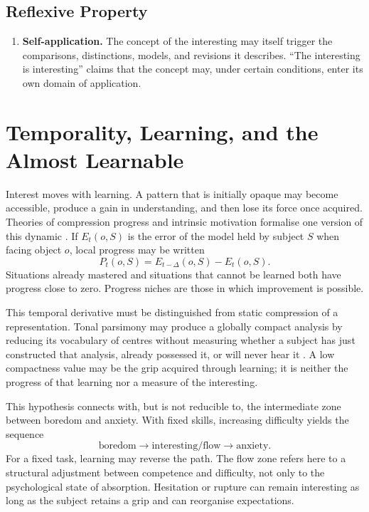 \documentclass[11pt,a4paper]{article}
\begin{document}
\subsection{Reflexive Property}

\begin{enumerate}[resume]
  \item \textbf{Self-application.} The concept of the interesting may itself
        trigger the comparisons, distinctions, models, and revisions it
        describes. ``The interesting is interesting'' claims that the concept
        may, under certain conditions, enter its own domain of application.
\end{enumerate}

\section{Temporality, Learning, and the Almost Learnable}

Interest moves with learning. A pattern that is initially opaque may become
accessible, produce a gain in understanding, and then lose its force once
acquired. Theories of compression progress and intrinsic motivation formalise
one version of this dynamic
\parencite{schmidhuber1997interesting,schmidhuber2009compression,oudeyer2007intrinsic,oudeyer2007typology}.
If \(E_t(o,S)\) is the error of the model held by subject \(S\) when facing
object \(o\), local progress may be written
\[
  P_t(o,S)=E_{t-\Delta}(o,S)-E_t(o,S).
\]
Situations already mastered and situations that cannot be learned both have
progress close to zero. Progress niches are those in which improvement is
possible.

This temporal derivative must be distinguished from static compression of a
representation. Tonal parsimony may produce a globally compact analysis by
reducing its vocabulary of centres without measuring whether a subject has just
constructed that analysis, already possessed it, or will never hear it
\parencite{pachet2026tonalparsimony}. A low compactness value may be the grip
acquired through learning; it is neither the progress of that learning nor a
measure of the interesting.

This hypothesis connects with, but is not reducible to, the intermediate zone
between boredom and anxiety. With fixed skills, increasing difficulty yields
the sequence
\[
  \text{boredom}\longrightarrow\text{interesting/flow}
  \longrightarrow\text{anxiety}.
\]
For a fixed task, learning may reverse the path. The flow zone refers here to a
structural adjustment between competence and difficulty, not only to the
psychological state of absorption. Hesitation or rupture can remain interesting
as long as the subject retains a grip and can reorganise expectations.
\end{document}
